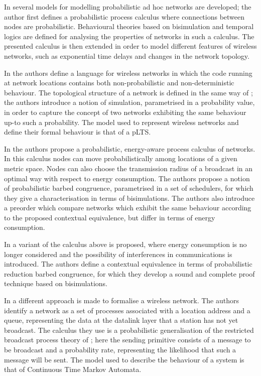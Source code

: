 \documentclass{LMCS}
\begin{document}
In \cite{songphd} several models for modelling probabilistic ad hoc networks 
are developed; the author first defines a probabilistic process calculus 
where connections between nodes are probabilistic. Behavioural theories 
based on bisimulation and temporal logics are defined for analysing the properties 
of networks in such a calculus. 
The presented calculus is then extended in order to model different features of 
wireless networks, such as exponential time delays and changes in the network topology. 

In \cite{LanotteM11} the authors define a language for wireless networks 
in which the code running at network locations contains both non-probabilistic 
and non-deterministic behaviour. The topological structure of a network 
is defined in the same way of \cite{merro}; the authors introduce a 
notion of simulation, parametrised in a probability value, in order 
to capture the concept of two networks exhibiting the same behaviour 
up-to such a probability. The model used to represent wireless networks 
and define their formal behaviour is that of a pLTS.

In \cite{gallina2011} the authors propose 
a probabilistic, energy-aware process calculus of networks. 
In this calculus nodes can move probabilistically 
among locations of a given metric space. Nodes can also choose the transmission 
radius of a broadcast in an optimal way with respect to energy consumption. 
The authors propose a notion of probabilistic barbed congruence, parametrised in a 
set of schedulers, for which they give a characterisation in terms of bisimulations. 
The authors also introduce a preorder which compare networks which exhibit 
the same behaviour according to the proposed contextual equivalence, but differ 
in terms of energy consumption.

In \cite{bugliesi2012} a variant of the calculus above is proposed, where 
energy consumption is no longer considered and the possibility of interferences in 
communications is introduced. The authors define a contextual equivalence in 
terms of probabilistic reduction barbed congruence, for which they develop a 
sound and complete proof technique based on bisimulations.

In \cite{ghassemi} a different approach is made to formalise a wireless 
network. The authors identify a network as a set of processes associated
 with a location address and a queue, representing the data 
at the datalink layer that a station has not yet broadcast. The calculus 
they use is a probabilistic generalisation of the restricted broadcast process theory 
of \cite{GwFM10}; here the sending primitive consists of a message to be broadcast and a probability 
rate, representing the likelihood that such a message will be sent. The 
model used to describe the behaviour of a system is that of 
Continuous Time Markov Automata.
\end{document}
